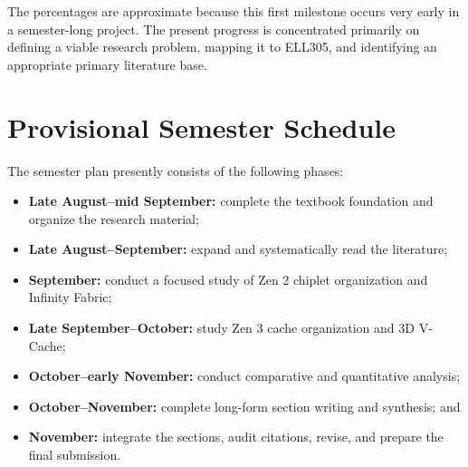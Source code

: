\documentclass[12pt,a4paper,twoside]{article}
\begin{document}
The percentages are approximate because this first milestone occurs very early in a semester-long project. The present progress is concentrated primarily on defining a viable research problem, mapping it to ELL305, and identifying an appropriate primary literature base.

\clearpage
\section{Provisional Semester Schedule}
\label{sec:schedule}

The semester plan presently consists of the following phases:

\begin{itemize}
  \item \textbf{Late August--mid September:} complete the textbook foundation and organize the research material;
  \item \textbf{Late August--September:} expand and systematically read the literature;
  \item \textbf{September:} conduct a focused study of Zen 2 chiplet organization and Infinity Fabric;
  \item \textbf{Late September--October:} study Zen 3 cache organization and 3D V-Cache;
  \item \textbf{October--early November:} conduct comparative and quantitative analysis;
  \item \textbf{October--November:} complete long-form section writing and synthesis; and
  \item \textbf{November:} integrate the sections, audit citations, revise, and prepare the final submission.
\end{itemize}
\end{document}
